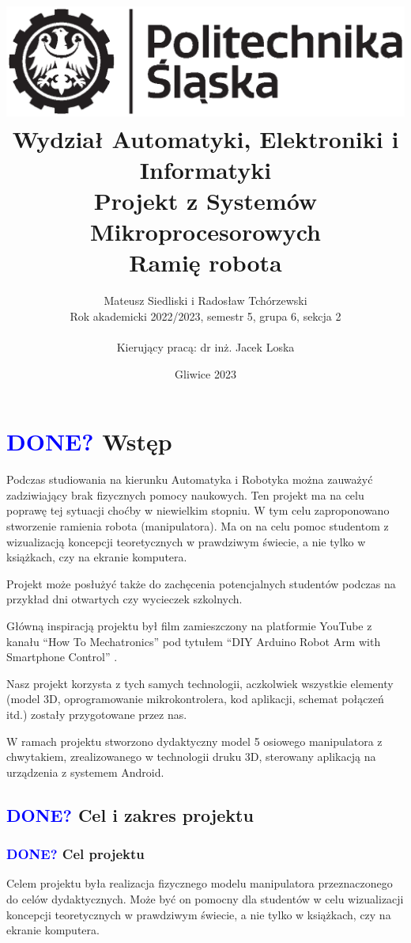 \documentclass[11pt,titlepage,a4paper]{article}
\title{
\includegraphics[scale=0.75]{img/politechnika_sl_logo_bw_poziom_pl.eps}\\
\textbf{
Wydział Automatyki, Elektroniki i Informatyki}\\
\vspace*{1cm}
Projekt z Systemów Mikroprocesorowych\\
Ramię robota\\
}
\author{Mateusz Siedliski i Radosław Tchórzewski\\
Rok akademicki 2022/2023, semestr 5, grupa 6, sekcja 2\\
\\
Kierujący pracą: dr inż. Jacek Loska}
\date{Gliwice 2023}
\begin{document}
\onehalfspacing

\maketitle

\tableofcontents

\newpage

\section{\textcolor{blue}{DONE?} Wstęp}

Podczas studiowania na kierunku Automatyka i Robotyka można zauważyć zadziwiający brak fizycznych pomocy naukowych. Ten projekt ma na celu poprawę tej sytuacji choćby w niewielkim stopniu. W tym celu zaproponowano stworzenie ramienia robota (manipulatora). Ma on na celu pomoc studentom z wizualizacją koncepcji teoretycznych w prawdziwym świecie, a nie tylko w książkach, czy na ekranie komputera.

Projekt może posłużyć także do zachęcenia potencjalnych studentów podczas na przykład dni otwartych czy wycieczek szkolnych.

Główną inspiracją projektu był film zamieszczony na platformie YouTube z kanału \enquote{How To Mechatronics} pod tytułem \enquote{DIY Arduino Robot Arm with Smartphone Control} \cite*{HTM_YT}.

Nasz projekt korzysta z tych samych technologii, aczkolwiek wszystkie elementy (model 3D, oprogramowanie mikrokontrolera, kod aplikacji, schemat połączeń itd.) zostały przygotowane przez nas.

W ramach projektu stworzono dydaktyczny model 5 osiowego manipulatora z chwytakiem, zrealizowanego w technologii druku 3D, sterowany aplikacją na urządzenia z systemem Android.

\vspace*{2.5cm}

\subsection{\textcolor{blue}{DONE?} Cel i zakres projektu}

\subsubsection{\textcolor{blue}{DONE?} Cel projektu}

Celem projektu była realizacja fizycznego modelu manipulatora przeznaczonego do celów dydaktycznych. Może być on pomocny dla studentów w celu wizualizacji koncepcji teoretycznych w prawdziwym świecie, a nie tylko w książkach, czy na ekranie komputera.
\end{document}
